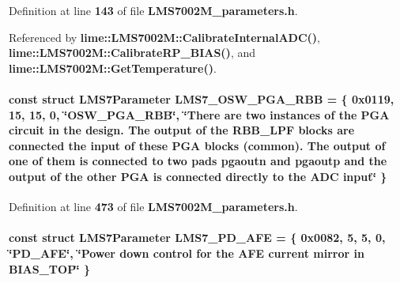 Definition at line {\bf 143} of file {\bf L\+M\+S7002\+M\+\_\+parameters.\+h}.



Referenced by {\bf lime\+::\+L\+M\+S7002\+M\+::\+Calibrate\+Internal\+A\+D\+C()}, {\bf lime\+::\+L\+M\+S7002\+M\+::\+Calibrate\+R\+P\+\_\+\+B\+I\+A\+S()}, and {\bf lime\+::\+L\+M\+S7002\+M\+::\+Get\+Temperature()}.

\paragraph[{L\+M\+S7\+\_\+\+O\+S\+W\+\_\+\+P\+G\+A\+\_\+\+R\+BB}]{\setlength{\rightskip}{0pt plus 5cm}const struct {\bf L\+M\+S7\+Parameter} L\+M\+S7\+\_\+\+O\+S\+W\+\_\+\+P\+G\+A\+\_\+\+R\+BB = \{ 0x0119, 15, 15, 0, \char`\"{}\+O\+S\+W\+\_\+\+P\+G\+A\+\_\+\+R\+B\+B\char`\"{}, \char`\"{}\+There are two instances of the P\+G\+A circuit in the design. The output of the R\+B\+B\+\_\+\+L\+P\+F blocks are connected the input of these P\+G\+A blocks (common). The output of one of them is connected to two pads pgaoutn and pgaoutp and the output of the other P\+G\+A is connected directly to the A\+D\+C input\char`\"{} \}\hspace{0.3cm}{\ttfamily [static]}}\label{LMS7002M__parameters_8h_a08347f3284b3f8bcefef393d39f26936}


Definition at line {\bf 473} of file {\bf L\+M\+S7002\+M\+\_\+parameters.\+h}.

\paragraph[{L\+M\+S7\+\_\+\+P\+D\+\_\+\+A\+FE}]{\setlength{\rightskip}{0pt plus 5cm}const struct {\bf L\+M\+S7\+Parameter} L\+M\+S7\+\_\+\+P\+D\+\_\+\+A\+FE = \{ 0x0082, 5, 5, 0, \char`\"{}\+P\+D\+\_\+\+A\+F\+E\char`\"{}, \char`\"{}\+Power down control for the A\+F\+E current mirror in B\+I\+A\+S\+\_\+\+T\+O\+P\char`\"{} \}\hspace{0.3cm}{\ttfamily [static]}}\label{LMS7002M__parameters_8h_a78d6a85e7c0c0fc19c4469409fb87fc8}


